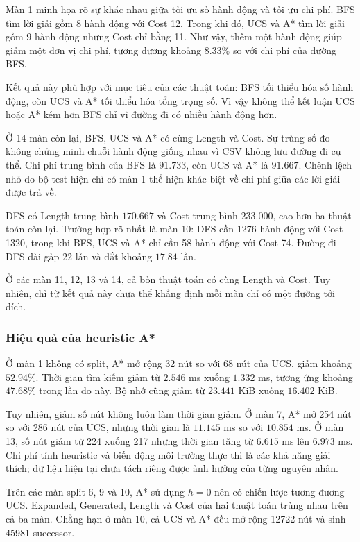 Màn 1 minh họa rõ sự khác nhau giữa tối ưu số hành động và
tối ưu chi phí. BFS tìm lời giải gồm 8 hành động với Cost 12.
Trong khi đó, UCS và A* tìm lời giải gồm 9 hành động nhưng
Cost chỉ bằng 11. Như vậy, thêm một hành động giúp giảm
một đơn vị chi phí, tương đương khoảng $8.33\%$ so với
chi phí của đường BFS.

Kết quả này phù hợp với mục tiêu của các thuật toán:
BFS tối thiểu hóa số hành động, còn UCS và A* tối thiểu hóa
tổng trọng số. Vì vậy không thể kết luận UCS hoặc A* kém hơn
BFS chỉ vì đường đi có nhiều hành động hơn.

Ở 14 màn còn lại, BFS, UCS và A* có cùng Length và Cost.
Sự trùng số đo không chứng minh chuỗi hành động giống nhau
vì CSV không lưu đường đi cụ thể. Chi phí trung bình của BFS
là $91.733$, còn UCS và A* là $91.667$. Chênh lệch nhỏ do
bộ test hiện chỉ có màn 1 thể hiện khác biệt về chi phí
giữa các lời giải được trả về.

DFS có Length trung bình $170.667$ và Cost trung bình
$233.000$, cao hơn ba thuật toán còn lại. Trường hợp rõ nhất
là màn 10: DFS cần 1276 hành động với Cost 1320, trong khi
BFS, UCS và A* chỉ cần 58 hành động với Cost 74.
Đường đi DFS dài gấp $22$ lần và đắt khoảng $17.84$ lần.

Ở các màn 11, 12, 13 và 14, cả bốn thuật toán có cùng Length
và Cost. Tuy nhiên, chỉ từ kết quả này chưa thể khẳng định
mỗi màn chỉ có một đường tới đích.

\subsubsection{Hiệu quả của heuristic A*}

Ở màn 1 không có split, A* mở rộng 32 nút so với 68 nút
của UCS, giảm khoảng $52.94\%$. Thời gian tìm kiếm giảm từ
$2.546$ ms xuống $1.332$ ms, tương ứng khoảng $47.68\%$
trong lần đo này. Bộ nhớ cũng giảm từ $23.441$ KiB xuống
$16.402$ KiB.

Tuy nhiên, giảm số nút không luôn làm thời gian giảm.
Ở màn 7, A* mở 254 nút so với 286 nút của UCS, nhưng
thời gian là $11.145$ ms so với $10.854$ ms.
Ở màn 13, số nút giảm từ 224 xuống 217 nhưng thời gian
tăng từ $6.615$ ms lên $6.973$ ms.
Chi phí tính heuristic và biến động môi trường thực thi
là các khả năng giải thích; dữ liệu hiện tại chưa tách
riêng được ảnh hưởng của từng nguyên nhân.

Trên các màn split 6, 9 và 10, A* sử dụng $h=0$ nên có
chiến lược tương đương UCS. Expanded, Generated, Length
và Cost của hai thuật toán trùng nhau trên cả ba màn.
Chẳng hạn ở màn 10, cả UCS và A* đều mở rộng 12722 nút
và sinh 45981 successor.


